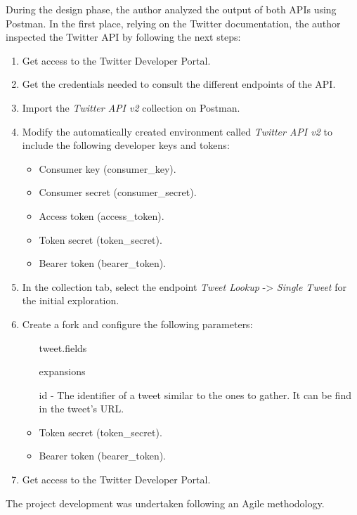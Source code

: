 \nonzeroparskip During the design phase, the author analyzed the output of both APIs using Postman. In the first place, relying on the Twitter documentation, the author inspected the Twitter API by following the next steps:
\begin{enumerate}
	\item Get access to the Twitter Developer Portal.
	\item Get the credentials needed to consult the different endpoints of the API.
	\item Import the \textit{Twitter API v2} collection on Postman.
	\item Modify the automatically created environment called \textit{Twitter API v2} to include the following developer keys and tokens:
	\begin{itemize}
		\item Consumer key (consumer\_key).
		\item Consumer secret (consumer\_secret).
		\item Access token (access\_token).
		\item Token secret (token\_secret).
		\item Bearer token (bearer\_token).
	\end{itemize}
	\item In the collection tab, select the endpoint \textit{Tweet Lookup} -> \textit{Single Tweet} for the initial exploration.
	\item Create a fork and configure the following parameters:
	\begin{itemize}
		\item[tweet.fields] 
		\item[expansions]
		\item[id] - The identifier of a tweet similar to the ones to gather. It can be find in the tweet's URL.
		\item Token secret (token\_secret).
		\item Bearer token (bearer\_token).
	\end{itemize}
	\item Get access to the Twitter Developer Portal.
\end{enumerate}


\nonzeroparskip The project development was undertaken following an Agile methodology.\\